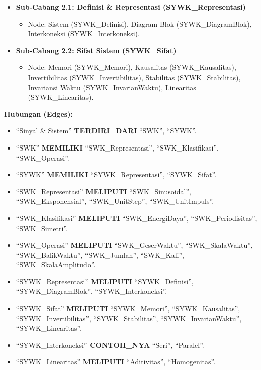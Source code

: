\documentclass[
  letterpaper,
  DIV=11,
  numbers=noendperiod]{scrreprt}
\providecommand{\tightlist}{%
  \setlength{\itemsep}{0pt}\setlength{\parskip}{0pt}}\usepackage{longtable,booktabs,array}
\begin{document}
\begin{itemize}
  \begin{itemize}
  \tightlist
  \item
    \textbf{Sub-Cabang 2.1: Definisi \& Representasi
    (SYWK\_Representasi)}

    \begin{itemize}
    \tightlist
    \item
      Node: Sistem (SYWK\_Definisi), Diagram Blok (SYWK\_DiagramBlok),
      Interkoneksi (SYWK\_Interkoneksi).
    \end{itemize}
  \item
    \textbf{Sub-Cabang 2.2: Sifat Sistem (SYWK\_Sifat)}

    \begin{itemize}
    \tightlist
    \item
      Node: Memori (SYWK\_Memori), Kausalitas (SYWK\_Kausalitas),
      Invertibilitas (SYWK\_Invertibilitas), Stabilitas
      (SYWK\_Stabilitas), Invariansi Waktu (SYWK\_InvarianWaktu),
      Linearitas (SYWK\_Linearitas).
    \end{itemize}
  \end{itemize}
\end{itemize}

\textbf{Hubungan (Edges):}

\begin{itemize}
\tightlist
\item
  ``Sinyal \& Sistem'' \textbf{TERDIRI\_DARI} ``SWK'', ``SYWK''.
\item
  ``SWK'' \textbf{MEMILIKI} ``SWK\_Representasi'', ``SWK\_Klasifikasi'',
  ``SWK\_Operasi''.
\item
  ``SYWK'' \textbf{MEMILIKI} ``SYWK\_Representasi'', ``SYWK\_Sifat''.
\item
  ``SWK\_Representasi'' \textbf{MELIPUTI} ``SWK\_Sinusoidal'',
  ``SWK\_Eksponensial'', ``SWK\_UnitStep'', ``SWK\_UnitImpuls''.
\item
  ``SWK\_Klasifikasi'' \textbf{MELIPUTI} ``SWK\_EnergiDaya'',
  ``SWK\_Periodisitas'', ``SWK\_Simetri''.
\item
  ``SWK\_Operasi'' \textbf{MELIPUTI} ``SWK\_GeserWaktu'',
  ``SWK\_SkalaWaktu'', ``SWK\_BalikWaktu'', ``SWK\_Jumlah'',
  ``SWK\_Kali'', ``SWK\_SkalaAmplitudo''.
\item
  ``SYWK\_Representasi'' \textbf{MELIPUTI} ``SYWK\_Definisi'',
  ``SYWK\_DiagramBlok'', ``SYWK\_Interkoneksi''.
\item
  ``SYWK\_Sifat'' \textbf{MELIPUTI} ``SYWK\_Memori'',
  ``SYWK\_Kausalitas'', ``SYWK\_Invertibilitas'', ``SYWK\_Stabilitas'',
  ``SYWK\_InvarianWaktu'', ``SYWK\_Linearitas''.
\item
  ``SYWK\_Interkoneksi'' \textbf{CONTOH\_NYA} ``Seri'', ``Paralel''.
\item
  ``SYWK\_Linearitas'' \textbf{MELIPUTI} ``Aditivitas'',
  ``Homogenitas''.
\end{itemize}
\end{document}
